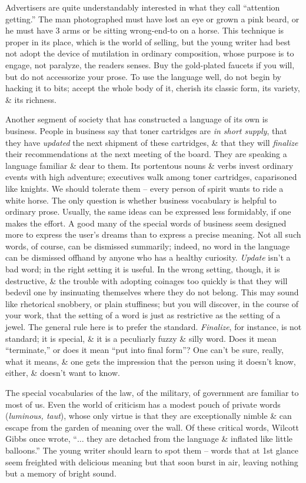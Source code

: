 \documentclass{article}
\numberwithin{equation}{section}
\begin{document}
Advertisers are quite understandably interested in what they call ``attention getting.'' The man photographed must have lost an eye or grown a pink beard, or he must have 3 arms or be sitting wrong-end-to on a horse. This technique is proper in its place, which is the world of selling, but the young writer had best not adopt the device of mutilation in ordinary composition, whose purpose is to engage, not paralyze, the readers senses. Buy the gold-plated faucets if you will, but do not accessorize your prose. To use the language well, do not begin by hacking it to bits; accept the whole body of it, cherish its classic form, its variety, \& its richness.

Another segment of society that has constructed a language of its own is business. People in business say that toner cartridges are \textit{in short supply}, that they have \textit{updated} the next shipment of these cartridges, \& that they will \textit{finalize} their recommendations at the next meeting of the board. They are speaking a language familiar \& dear to them. Its portentous nouns \& verbs invest ordinary events with high adventure; executives walk among toner cartridges, caparisoned like knights. We should tolerate them -- every person of spirit wants to ride a white horse. The only question is whether business vocabulary is helpful to ordinary prose. Usually, the same ideas can be expressed less formidably, if one makes the effort. A good many of the special words of business seem designed more to express the user's dreams than to express a precise meaning. Not all such words, of course, can be dismissed summarily; indeed, no word in the language can be dismissed offhand by anyone who has a healthy curiosity. \textit{Update} isn't a bad word; in the right setting it is useful. In the wrong setting, though, it is destructive, \& the trouble with adopting coinages too quickly is that they will bedevil one by insinuating themselves where they do not belong. This may sound like rhetorical snobbery, or plain stuffiness; but you will discover, in the course of your work, that the setting of a word is just as restrictive as the setting of a jewel. The general rule here is to prefer the standard. \textit{Finalize}, for instance, is not standard; it is special, \& it is a peculiarly fuzzy \& silly word. Does it mean ``terminate,'' or does it mean ``put into final form''? One can't be sure, really, what it means, \& one gets the impression that the person using it doesn't know, either, \& doesn't want to know.

The special vocabularies of the law, of the military, of government are familiar to most of us. Even the world of criticism has a modest pouch of private words (\textit{luminous, taut}), whose only virtue is that they are exceptionally nimble \& can escape from the garden of meaning over the wall. Of these critical words, Wilcott Gibbs once wrote, ``$\ldots$ they are detached from the language \& inflated like little balloons.'' The young writer should learn to spot them -- words that at 1st glance seem freighted with delicious meaning but that soon burst in air, leaving nothing but a memory of bright sound.
\end{document}
